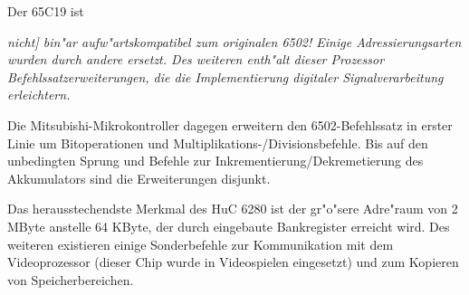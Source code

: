 \documentclass[12pt,a4paper,twoside]{report}
\begin{document}
Der 65C19 ist {\em nicht] bin"ar aufw"artskompatibel zum
originalen 6502!  Einige Adressierungsarten wurden durch andere
ersetzt.  Des weiteren enth"alt dieser Prozessor
Befehlssatzerweiterungen, die die Implementierung digitaler
Signalverarbeitung erleichtern.

Die Mitsubishi-Mikrokontroller dagegen erweitern den
6502-Befehlssatz in erster Linie um Bitoperationen und
Multiplikations-/Divisionsbefehle.  Bis auf den unbedingten Sprung und
Befehle zur Inkrementierung/Dekremetierung des Akkumulators sind die
Erweiterungen disjunkt.

Das herausstechendste Merkmal des HuC 6280 ist der gr"o"sere
Adre"raum von 2 MByte anstelle 64 KByte, der durch eingebaute
Bankregister erreicht wird.   Des weiteren existieren einige
Sonderbefehle zur Kommunikation mit dem Videoprozessor (dieser
Chip wurde in Videospielen eingesetzt) und zum Kopieren von
Speicherbereichen.

}
\end{document}
